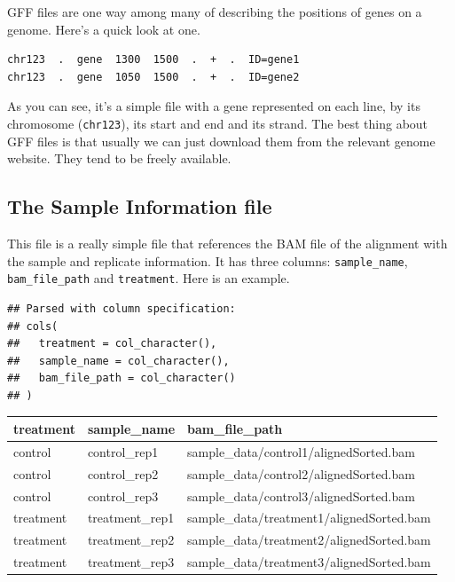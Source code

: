 \documentclass[]{book}
\begin{document}
GFF files are one way among many of describing the positions of genes on a genome. Here's a quick look at one.

\begin{verbatim}
chr123  .  gene  1300  1500  .  +  .  ID=gene1
chr123  .  gene  1050  1500  .  +  .  ID=gene2
\end{verbatim}

As you can see, it's a simple file with a gene represented on each line, by its chromosome (\texttt{chr123}), its start and end and its strand. The best thing about GFF files is that usually we can just download them from the relevant genome website. They tend to be freely available.

\hypertarget{the-sample-information-file}{%
\subsection{The Sample Information file}\label{the-sample-information-file}}

This file is a really simple file that references the BAM file of the alignment with the sample and replicate information. It has three columns: \texttt{sample\_name}, \texttt{bam\_file\_path} and \texttt{treatment}.
Here is an example.

\begin{verbatim}
## Parsed with column specification:
## cols(
##   treatment = col_character(),
##   sample_name = col_character(),
##   bam_file_path = col_character()
## )
\end{verbatim}

\begin{tabular}{l|l|l}
\hline
treatment & sample\_name & bam\_file\_path\\
\hline
control & control\_rep1 & sample\_data/control1/alignedSorted.bam\\
\hline
control & control\_rep2 & sample\_data/control2/alignedSorted.bam\\
\hline
control & control\_rep3 & sample\_data/control3/alignedSorted.bam\\
\hline
treatment & treatment\_rep1 & sample\_data/treatment1/alignedSorted.bam\\
\hline
treatment & treatment\_rep2 & sample\_data/treatment2/alignedSorted.bam\\
\hline
treatment & treatment\_rep3 & sample\_data/treatment3/alignedSorted.bam\\
\hline
\end{tabular}
\end{document}
